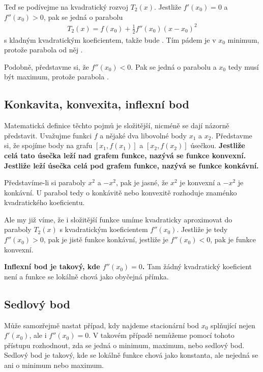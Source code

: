 Teď se podívejme na kvadratický rozvoj $T_2(x)$. Jestliže $f'(x_0)=0$ a $f''(x_0) > 0$, pak se jedná o parabolu 
\begin{align}
    T_2(x) = f(x_0) + \frac{1}{2} f''(x_0) (x-x_0)^2
\end{align}
s kladným kvadratickým koeficientem, takže bude . Tím pádem je v $x_0$ minimum, protože parabola od něj .

Podobně, představme si, že $f''(x_0) < 0$. Pak se jedná o parabolu  a $x_0$ tedy musí být maximum, protože parabola .

\subsection{Konkavita, konvexita, inflexní bod}

Matematická definice těchto pojmů je složitější, nicméně se dají názorně představit. Uvažujme funkci $f$ a nějaké dva libovolné body $x_1$ a $x_2$. Představme si, že spojíme body na grafu $[x_1, f(x_1)]$ a $[x_2, f(x_2)]$ úsečkou.
\textbf{Jestliže celá tato úsečka leží nad grafem funkce, nazývá se funkce konvexní. Jestliže leží úsečka celá pod grafem funkce, nazývá se funkce konkávní.}

Představíme-li si paraboly $x^2$ a $-x^2$, pak je jasné, že $x^2$ je konvexní a $-x^2$ je konkávní. U parabol tedy o konkávitě nebo konvexitě rozhoduje znaménko kvadratického koeficientu.

Ale my již víme, že i složitější funkce umíme kvadraticky aproximovat do paraboly $T_2(x)$ s kvadratickým koeficientem $f''(x_0)$. Jestliže je tedy $f''(x_0)>0$, pak je jistě funkce konkávní, jestliže je $f''(x_0)<0$, pak je funkce konvexní.

\textbf{Inflexní bod je takový, kde $f''(x_0) = 0$.} Tam žádný kvadratický koeficient není a funkce se lokálně chová jako obyčejná přímka.

\subsection{Sedlový bod}

Může samozřejmě nastat případ, kdy najdeme stacionární bod $x_0$ splňující nejen $f'(x_0)$, ale i $f''(x_0) = 0$. V takovém případě nemůžeme pomocí tohoto přístupu rozhodnout, zda se jedná o minimum, maximum, nebo sedlový bod. Sedlový bod je takový, kde se lokálně funkce chová jako konstanta, ale nejedná se ani o minimum nebo maximum.

